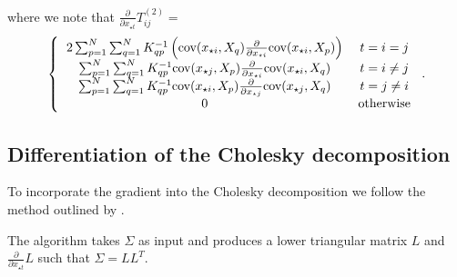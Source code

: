 \documentclass[phd,tocprelim]{cornell}
\begin{document}
where we note that $\frac{\partial}{\partial x_{\star t}} T^{(2)}_{ij} = $
\begin{equation}
    \left\{ \begin{tabular}{cc}
        $2 \sum_{p = 1}^{N} \sum_{q = 1}^{N} K^{-1}_{qp} \left( \mbox{cov}(x_{\star i}, X_{q}) \frac{\partial}{\partial x_{\star i}} \mbox{cov}(x_{\star i}, X_{p}) \right)$ & $t = i = j$ \\
        $\sum_{p = 1}^{N} \sum_{q = 1}^{N} K^{-1}_{qp} \mbox{cov}(x_{\star j}, X_{p}) \frac{\partial}{\partial x_{\star i}} \mbox{cov}(x_{\star i}, X_{q})$ & $t = i \neq j$ \\
							$\sum_{p = 1}^{N} \sum_{q = 1}^{N} K^{-1}_{qp} \mbox{cov}(x_{\star i}, X_{p}) \frac{\partial}{\partial x_{\star j}} \mbox{cov}(x_{\star j}, X_{q})$ & $t = j \neq i$ \\
							$0$ & otherwise
                                                      \end{tabular} \right..
\end{equation}

\subsection{Differentiation of the Cholesky decomposition}

To incorporate the gradient into the Cholesky decomposition we follow the method outlined by \cite{Smith1995}.

The algorithm takes $\Sigma$ as input and produces a lower triangular matrix $L$ and $\frac{\partial}{\partial x_{\star t}} L$ such that $\Sigma = LL^{T}$.
\end{document}
